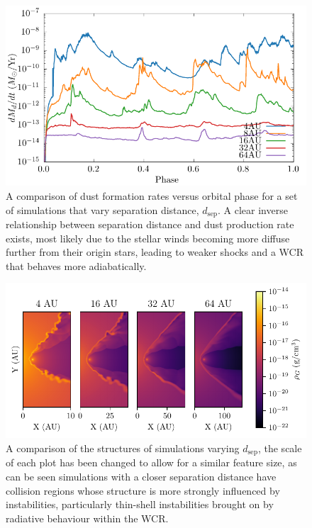 \documentclass[fleqn,usenatbib]{mnras}
\begin{document}
\begin{figure}
  \centering
  \includegraphics[width=\linewidth]{assets/dsep-phase-dust_rate.pdf}
  \caption[Dust formation rate versus binary separation distance]{A comparison of dust formation rates versus orbital phase for a set of simulations that vary separation distance, $d_\text{sep}$. A clear inverse relationship between separation distance and dust production rate exists, most likely due to the stellar winds becoming more diffuse further from their origin stars, leading to weaker shocks and a WCR that behaves more adiabatically.}
  \label{fig:dsepdustproduction}
\end{figure}

\begin{figure}
  \centering
  \includegraphics{assets/adiabatic-flow/instab-comp-rho.pdf}
  \caption[A comparison of the structures of simulations varying $d_\text{sep}$]{A comparison of the structures of simulations varying $d_\text{sep}$, the scale of each plot has been changed to allow for a similar feature size, as can be seen simulations with a closer separation distance have collision regions whose structure is more strongly influenced by instabilities, particularly thin-shell instabilities brought on by radiative behaviour within the WCR.}
  \label{fig:dsepinstabilities}
\end{figure}
\end{document}
